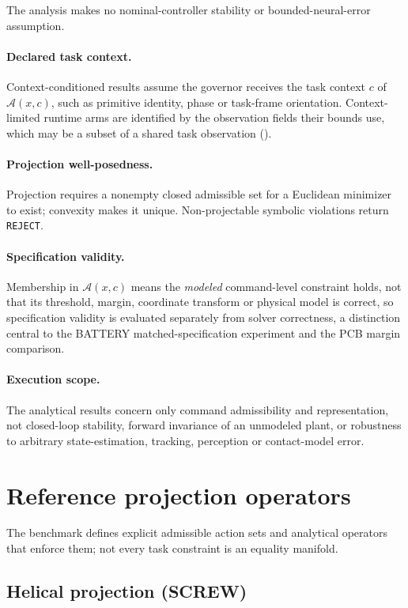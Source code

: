 \documentclass[10pt]{article}
\let\suppsection\suppname
\begin{document}
The analysis makes no nominal-controller stability or bounded-neural-error assumption.

\paragraph{Declared task context.}
Context-conditioned results assume the governor receives the task context $c$
of $\mathcal{A}(x,c)$, such as primitive identity, phase or
task-frame orientation. Context-limited runtime arms are identified by the
observation fields their bounds use, which may be a subset of a shared task observation (\suppsection{S4}).

\paragraph{Projection well-posedness.}
Projection requires a nonempty closed admissible set for a Euclidean minimizer
to exist; convexity makes it unique. Non-projectable symbolic
violations return \texttt{REJECT}.

\paragraph{Specification validity.}
Membership in $\mathcal{A}(x,c)$ means the \emph{modeled} command-level
constraint holds, not that its threshold, margin, coordinate transform or
physical model is correct, so specification validity is evaluated
separately from solver correctness, a distinction central to the BATTERY
matched-specification experiment and the PCB margin comparison.

\paragraph{Execution scope.}
The analytical results concern only command admissibility and representation,
not closed-loop stability, forward invariance of an unmodeled plant, or
robustness to arbitrary state-estimation, tracking, perception or contact-model
error.


\section{Reference projection operators}

The benchmark defines explicit admissible action sets and analytical
operators that enforce them; not every task constraint is an equality manifold.


\subsection{Helical projection (SCREW)}
\end{document}

